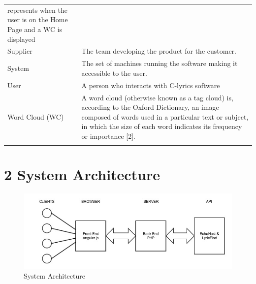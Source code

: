 \documentclass[]{article}
\begin{document}
\begin{longtable}[c]{@{}ll@{}}
\begin{minipage}[t]{0.47\columnwidth}
represents when the user is on the Home Page and a WC is displayed
\end{minipage}
\\\addlinespace
\begin{minipage}[t]{0.47\columnwidth}\raggedright
Supplier
\end{minipage} & \begin{minipage}[t]{0.47\columnwidth}\raggedright
The team developing the product for the customer.
\end{minipage}
\\\addlinespace
\begin{minipage}[t]{0.47\columnwidth}\raggedright
System
\end{minipage} & \begin{minipage}[t]{0.47\columnwidth}\raggedright
The set of machines running the software making it accessible to the
user.
\end{minipage}
\\\addlinespace
\begin{minipage}[t]{0.47\columnwidth}\raggedright
User
\end{minipage} & \begin{minipage}[t]{0.47\columnwidth}\raggedright
A person who interacts with C-lyrics software
\end{minipage}
\\\addlinespace
\begin{minipage}[t]{0.47\columnwidth}\raggedright
Word Cloud (WC)
\end{minipage} & \begin{minipage}[t]{0.47\columnwidth}\raggedright
A word cloud (otherwise known as a tag cloud) is, according to the
Oxford Dictionary, an image composed of words used in a particular text
or subject, in which the size of each word indicates its frequency or
importance {[}2{]}.
\end{minipage}
\\\addlinespace
\bottomrule
\end{longtable}

\section{2 System Architecture}\label{system-architecture}

\begin{figure}[htbp]
\centering
\includegraphics{system_arch.jpg}
\caption{System Architecture}
\end{figure}
\end{document}
